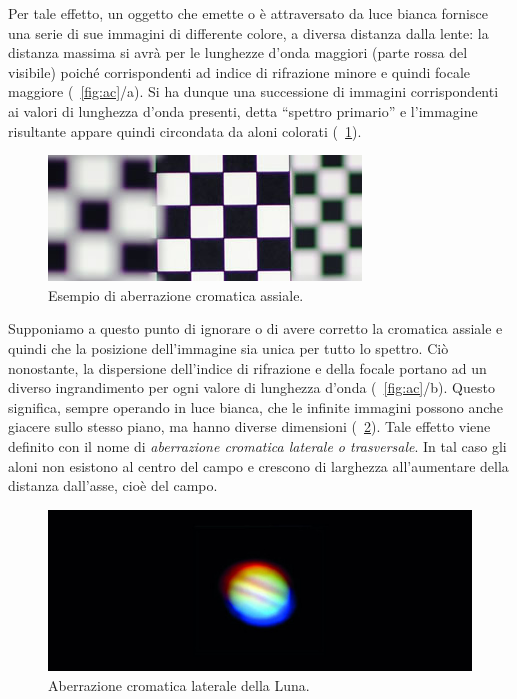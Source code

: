 \begin{itemize}
Per tale effetto, un oggetto che emette o è attraversato da luce bianca fornisce una serie di sue immagini di differente colore, a diversa distanza dalla lente: la distanza massima si avrà per le lunghezze d'onda maggiori (parte rossa del visibile) poiché corrispondenti ad indice di rifrazione minore e quindi focale maggiore (\figurename~\ref{fig:ac}/a). 
Si ha dunque una successione di immagini corrispondenti ai valori di lunghezza d'onda presenti, detta ``spettro primario'' e l'immagine risultante appare quindi circondata da aloni colorati (\figurename~\ref{fig:aca}).

\begin{figure}
 \centering
 \includegraphics[scale=.65]{img/CAP2aca.jpg}
 \caption{\small{Esempio di aberrazione cromatica assiale.}}
 \label{fig:aca}
\end{figure}

Supponiamo a questo punto di ignorare o di avere corretto la cromatica assiale e quindi che la posizione dell'immagine sia unica per tutto lo spettro.
Ciò nonostante, la dispersione dell'indice di rifrazione e della focale portano ad un diverso ingrandimento per ogni valore di lunghezza d'onda (\figurename~\ref{fig:ac}/b). 
Questo significa, sempre operando in luce bianca, che le infinite immagini possono anche giacere sullo stesso piano, ma hanno diverse dimensioni (\figurename~\ref{fig:acl}). 
Tale effetto viene definito con il nome di \textit{aberrazione cromatica laterale o trasversale}.
In tal caso gli aloni non esistono al centro del campo e crescono di larghezza all'aumentare della distanza dall'asse, cioè del campo.

\begin{figure}
 \centering
 \includegraphics[scale=.30]{img/CAP2acl.jpg}
 \caption{\small{Aberrazione cromatica laterale della Luna.}}
 \label{fig:acl}
\end{figure}


\end{itemize}
